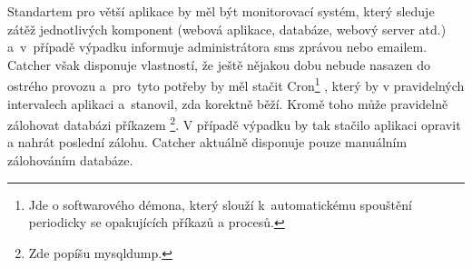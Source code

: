 Standartem pro větší aplikace by měl být monitorovací systém,
který sleduje zátěž jednotlivých komponent (webová aplikace, databáze, webový server atd.)
a~v~případě výpadku informuje administrátora sms zprávou nebo emailem.
Catcher však disponuje vlastností, že ještě nějakou dobu nebude nasazen do ostrého provozu
a~pro~tyto potřeby by měl stačit Cron\footnote{Jde o softwarového démona, který slouží
k~automatickému spouštění periodicky se opakujících příkazů a procesů.}
, který by v pravidelných intervalech  aplikaci a~stanovil, zda korektně běží.
Kromě toho může pravidelně zálohovat databázi příkazem \footnote{Zde popíšu mysqldump.}.
V případě výpadku by tak stačilo aplikaci opravit a nahrát poslední zálohu.
Catcher aktuálně disponuje pouze manuálním zálohováním databáze.



